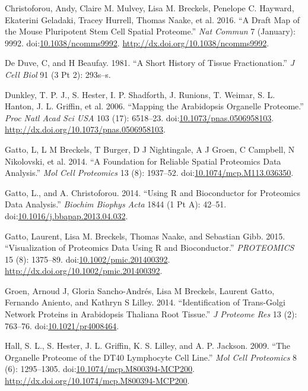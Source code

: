 Christoforou, Andy, Claire M. Mulvey, Lisa M. Breckels, Penelope C.
Hayward, Ekaterini Geladaki, Tracey Hurrell, Thomas Naake, et al. 2016.
``A Draft Map of the Mouse Pluripotent Stem Cell Spatial Proteome.''
\emph{Nat Commun} 7 (January): 9992.
doi:\href{http://dx.doi.org/10.1038/ncomms9992}{10.1038/ncomms9992}.
\url{http://dx.doi.org/10.1038/ncomms9992}.

De Duve, C, and H Beaufay. 1981. ``A Short History of Tissue
Fractionation.'' \emph{J Cell Biol} 91 (3 Pt 2): 293s--s.

Dunkley, T. P. J., S. Hester, I. P. Shadforth, J. Runions, T. Weimar, S.
L. Hanton, J. L. Griffin, et al. 2006. ``Mapping the Arabidopsis
Organelle Proteome.'' \emph{Proc Natl Acad Sci USA} 103 (17): 6518--23.
doi:\href{http://dx.doi.org/10.1073/pnas.0506958103}{10.1073/pnas.0506958103}.
\url{http://dx.doi.org/10.1073/pnas.0506958103}.

Gatto, L, L M Breckels, T Burger, D J Nightingale, A J Groen, C
Campbell, N Nikolovski, et al. 2014. ``A Foundation for Reliable Spatial
Proteomics Data Analysis.'' \emph{Mol Cell Proteomics} 13 (8): 1937--52.
doi:\href{http://dx.doi.org/10.1074/mcp.M113.036350}{10.1074/mcp.M113.036350}.

Gatto, L., and A. Christoforou. 2014. ``Using R and Bioconductor for
Proteomics Data Analysis.'' \emph{Biochim Biophys Acta} 1844 (1 Pt A):
42--51.
doi:\href{http://dx.doi.org/10.1016/j.bbapap.2013.04.032}{10.1016/j.bbapap.2013.04.032}.

Gatto, Laurent, Lisa M. Breckels, Thomas Naake, and Sebastian Gibb.
2015. ``Visualization of Proteomics Data Using R and Bioconductor.''
\emph{PROTEOMICS} 15 (8): 1375--89.
doi:\href{http://dx.doi.org/10.1002/pmic.201400392}{10.1002/pmic.201400392}.
\url{http://dx.doi.org/10.1002/pmic.201400392}.

Groen, Arnoud J, Gloria Sancho-Andr{é}s, Lisa M Breckels, Laurent Gatto,
Fernando Aniento, and Kathryn S Lilley. 2014. ``Identification of
Trans-Golgi Network Proteins in Arabidopsis Thaliana Root Tissue.''
\emph{J Proteome Res} 13 (2): 763--76.
doi:\href{http://dx.doi.org/10.1021/pr4008464}{10.1021/pr4008464}.

Hall, S. L., S. Hester, J. L. Griffin, K. S. Lilley, and A. P. Jackson.
2009. ``The Organelle Proteome of the DT40 Lymphocyte Cell Line.''
\emph{Mol Cell Proteomics} 8 (6): 1295--1305.
doi:\href{http://dx.doi.org/10.1074/mcp.M800394-MCP200}{10.1074/mcp.M800394-MCP200}.
\url{http://dx.doi.org/10.1074/mcp.M800394-MCP200}.

